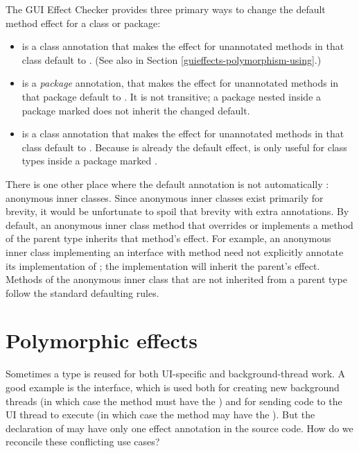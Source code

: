 The GUI Effect Checker provides three primary ways to change the default method effect for a class
or package:
\begin{itemize}
\item {} is a class annotation that makes the effect for unannotated methods in that
class default to
.  (See also  in Section \ref{guieffects-polymorphism-using}.)
\item {} is a \emph{package} annotation, that makes the effect for unannotated
methods in that package default to .  It is not transitive; a package nested inside
a package marked  does not inherit the changed default.
\item {} is a class annotation that makes the effect for unannotated methods in that
class default to .  Because  is already the default
effect,  is only useful for class types inside a package marked .
\end{itemize}

There is one other place where the default annotation is not automatically :
anonymous inner classes.  Since anonymous inner classes exist primarily for brevity, it would be
unfortunate to spoil that brevity with extra annotations.  By default, an anonymous inner class
method that overrides or implements a method of the parent type inherits that method's effect.
For example, an anonymous inner class implementing an interface with method  need not explicitly annotate its implementation of ; the implementation will inherit
the parent's effect.  Methods of the anonymous inner class that are not inherited from a parent type
follow the standard defaulting rules.

\section{Polymorphic effects\label{guieffects-polymorphism}}
Sometimes a type is reused for both UI-specific and background-thread work.  A good example is the
 interface, which is used both for creating new background threads (in which case the
 method must have the ) and for sending code to the UI thread to
execute (in which case the  method may have the
).  But the declaration of
 may have only one effect annotation in the source code.
How do we reconcile these
conflicting use cases?

